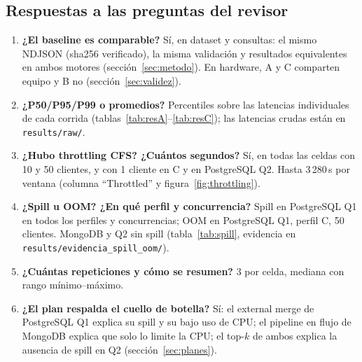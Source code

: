 \documentclass[11pt,letterpaper]{article}
\begin{document}
\subsection*{Respuestas a las preguntas del revisor}
\begin{enumerate}
  \item \textbf{¿El baseline es comparable?} Sí, en dataset y consultas: el mismo NDJSON
        (sha256 verificado), la misma validación y resultados equivalentes en ambos motores
        (sección~\ref{sec:metodo}). En hardware, A y C comparten equipo y B no
        (sección~\ref{sec:validez}).
  \item \textbf{¿P50/P95/P99 o promedios?} Percentiles sobre las latencias individuales de cada
        corrida (tablas~\ref{tab:resA}--\ref{tab:resC}); las latencias crudas están en
        \texttt{results/raw/}.
  \item \textbf{¿Hubo throttling CFS? ¿Cuántos segundos?} Sí, en todas las celdas con 10 y 50
        clientes, y con 1 cliente en C y en PostgreSQL Q2. Hasta 3\,280\,s por ventana (columna ``Throttled'' y
        figura~\ref{fig:throttling}).
  \item \textbf{¿Spill u OOM? ¿En qué perfil y concurrencia?} Spill en PostgreSQL Q1 en todos los
        perfiles y concurrencias; OOM en PostgreSQL Q1, perfil C, 50 clientes. MongoDB y Q2 sin
        spill (tabla~\ref{tab:spill}, evidencia en \texttt{results/evidencia\_spill\_oom/}).
  \item \textbf{¿Cuántas repeticiones y cómo se resumen?} 3 por celda, mediana con rango
        mínimo--máximo.
  \item \textbf{¿El plan respalda el cuello de botella?} Sí: el external merge de PostgreSQL Q1
        explica su spill y su bajo uso de CPU; el pipeline en flujo de MongoDB explica que solo lo
        limite la CPU; el top-$k$ de ambos explica la ausencia de spill en Q2
        (sección~\ref{sec:planes}).
\end{enumerate}

\end{document}
